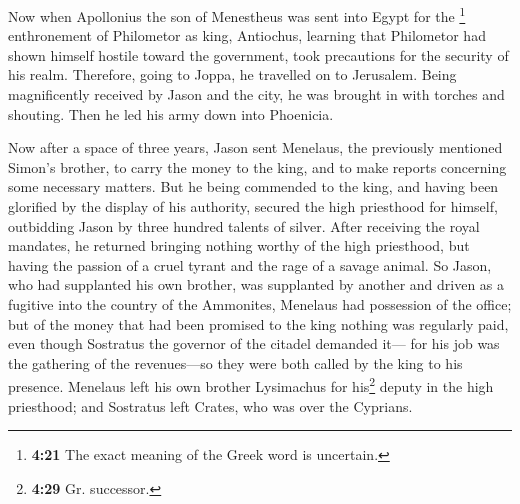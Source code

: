  Now when Apollonius the son of Menestheus was sent into
Egypt for the \footnote{\textbf{4:21} The exact meaning of the Greek
  word is uncertain.} enthronement of Philometor as king, Antiochus,
learning that Philometor had shown himself hostile toward the
government, took precautions for the security of his realm. Therefore,
going to Joppa, he travelled on to Jerusalem.  Being
magnificently received by Jason and the city, he was brought in with
torches and shouting. Then he led his army down into Phoenicia.

 Now after a space of three years, Jason sent Menelaus,
the previously mentioned Simon's brother, to carry the money to the
king, and to make reports concerning some necessary matters.
 But he being commended to the king, and having been
glorified by the display of his authority, secured the high priesthood
for himself, outbidding Jason by three hundred talents of silver.
 After receiving the royal mandates, he returned bringing
nothing worthy of the high priesthood, but having the passion of a cruel
tyrant and the rage of a savage animal.  So Jason, who
had supplanted his own brother, was supplanted by another and driven as
a fugitive into the country of the Ammonites,  Menelaus
had possession of the office; but of the money that had been promised to
the king nothing was regularly paid, even though Sostratus the governor
of the citadel demanded it---  for his job was the
gathering of the revenues---so they were both called by the king to his
presence.  Menelaus left his own brother Lysimachus for
his\footnote{\textbf{4:29} Gr. successor.} deputy in the high
priesthood; and Sostratus left Crates, who was over the Cyprians.

